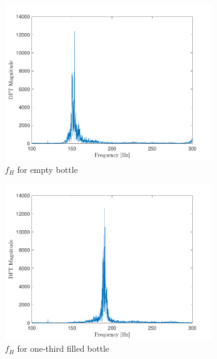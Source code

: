 \documentclass[10pt]{article}
\begin{document}
\begin{figure}[ht]
    \centering
    \begin{subfigure}[b]{0.48\textwidth}
        \includegraphics[width=\textwidth]{problem6_empty_bottle_resonance_spectra.pdf}
        \caption{$f_H$ for empty bottle}
    \end{subfigure}
    \quad
    \begin{subfigure}[b]{0.48\textwidth}
        \includegraphics[width=\textwidth]{problem6_filled_bottle_resonance_spectra.pdf}
        \caption{$f_H$ for one-third filled bottle}
    \end{subfigure}
    \quad
    \begin{subfigure}[b]{0.48\textwidth}
        \centering

\end{subfigure}
\end{figure}
\end{document}
